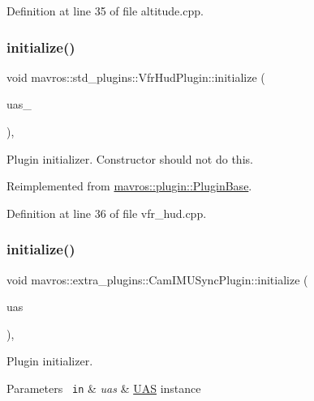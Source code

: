 Definition at line 35 of file altitude.\+cpp.

\mbox{\label{group__plugin_gacf050334e6d790e496ca5a35a5e34f2d}} 
\subsubsection{\texorpdfstring{initialize()}{initialize()}\hspace{0.1cm}{\footnotesize\ttfamily [10/41]}}
{\footnotesize\ttfamily void mavros\+::std\+\_\+plugins\+::\+Vfr\+Hud\+Plugin\+::initialize (\begin{DoxyParamCaption}\item[{\mbox{\hyperlink{classmavros_1_1UAS}{U\+AS}} \&}]{uas\+\_\+ }\end{DoxyParamCaption})\hspace{0.3cm}{\ttfamily [inline]}, {\ttfamily [virtual]}}

Plugin initializer. Constructor should not do this. 

Reimplemented from \mbox{\hyperlink{group__plugin_gad5313a41da4d26acbbabf008cdc21e82}{mavros\+::plugin\+::\+Plugin\+Base}}.



Definition at line 36 of file vfr\+\_\+hud.\+cpp.

\mbox{\label{group__plugin_ga6f1ea337208a0cc239f23025209b8be8}} 
\subsubsection{\texorpdfstring{initialize()}{initialize()}\hspace{0.1cm}{\footnotesize\ttfamily [11/41]}}
{\footnotesize\ttfamily void mavros\+::extra\+\_\+plugins\+::\+Cam\+I\+M\+U\+Sync\+Plugin\+::initialize (\begin{DoxyParamCaption}\item[{\mbox{\hyperlink{classmavros_1_1UAS}{U\+AS}} \&}]{uas }\end{DoxyParamCaption})\hspace{0.3cm}{\ttfamily [inline]}, {\ttfamily [virtual]}}



Plugin initializer. 


\begin{DoxyParams}[1]{Parameters}
\mbox{\texttt{ in}}  & {\em uas} & {\ttfamily \mbox{\hyperlink{classmavros_1_1UAS}{U\+AS}}} instance \\
\hline
\end{DoxyParams}


